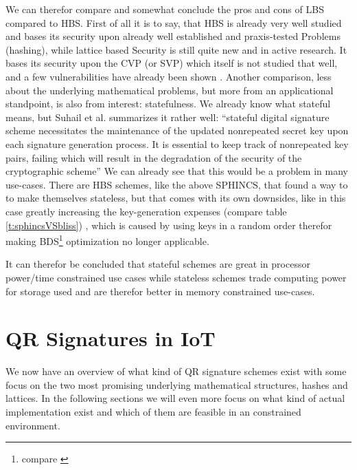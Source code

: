 \documentclass[conference]{IEEEtran}
\begin{document}
We can therefor compare and somewhat conclude the pros and cons of LBS compared to HBS.
First of all it is to say, that HBS is already very well studied and bases its security upon already well established and praxis-tested Problems (hashing), while lattice based Security is still quite new and in active research. It bases its security upon the CVP (or SVP) which itself is not studied that well, and a few vulnerabilities have already been shown \cite{QR_sigs}.
Another comparison, less about the underlying mathematical problems, but more from an applicational standpoint, is also from interest: statefulness.
We already know what stateful means, but Suhail et al. summarizes it rather well: 
``stateful digital signature scheme necessitates the maintenance of the updated nonrepeated secret key upon each signature generation process. It is essential to keep track of nonrepeated key pairs, failing which will result in the degradation of the security of the cryptographic scheme'' 
We can already see that this would be a problem in many use-cases.
There are HBS schemes, like the above SPHINCS, that found a way to to make themselves stateless, but that comes with its own downsides, like in this case greatly increasing the key-generation expenses (compare table \ref{t:sphincsVSbliss}) , which is caused by using keys in a random order therefor making BDS\footnote{compare \cite{BDS_optim}} optimization no longer applicable. %

It can therefor be concluded that stateful schemes are great in processor power/time constrained use cases while stateless schemes trade computing power for storage used and are therefor better in memory constrained use-cases. \cite{QR_sigs}

\section{QR Signatures in IoT}

We now have an overview of what kind of QR signature schemes exist with some focus on the two most promising underlying mathematical structures, hashes and lattices. In the following sections we will even more focus on what kind of actual implementation exist and which of them are feasible in an constrained environment.
\end{document}
